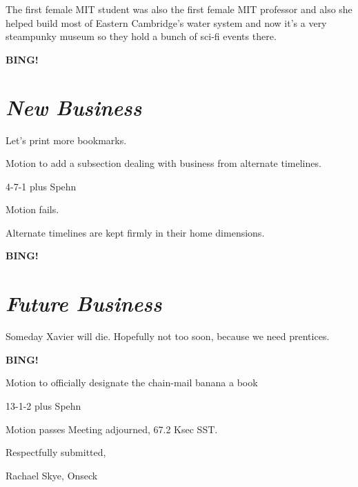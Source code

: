 \documentclass[10pt]{article}
\newcommand{\bing}{{\bf BING!} }
\newcommand{\goto}[1]{\bing \vskip 12pt \section*{{\em{#1}}}}
\newcommand{\ps}{ plus Spehn\xspace}
\newcommand{\onseck}{Rachael Skye, Onseck}
\begin{document}
The first female MIT student was also the first female MIT professor and also she helped build most of Eastern Cambridge's water system and now it's a very steampunky museum so they hold a bunch of sci-fi events there.

\goto{New Business}

Let's print more bookmarks.

Motion to add a subsection dealing with business from alternate timelines.

4-7-1\ps

Motion fails.

Alternate timelines are kept firmly in their home dimensions.

\goto{Future Business}

Someday Xavier will die.  Hopefully not too soon, because we need prentices.

\bing

Motion to officially designate the chain-mail banana a book

13-1-2\ps

Motion passes
\noindent
Meeting adjourned, 67.2 Ksec SST.

\vspace{18pt}

\centerline{Respectfully submitted,}
\centerline{\onseck}
\end{document}
